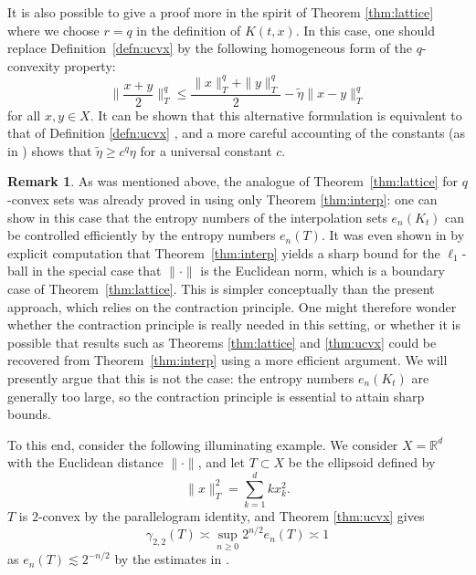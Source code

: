 \documentclass[10pt,reqno]{amsart}
\theoremstyle{definition}
\newtheorem{rem}[thm]{Remark}
\numberwithin{equation}{section}
\numberwithin{figure}{section}
\numberwithin{table}{section}
\begin{document}
It is also possible to give a proof more in the spirit of Theorem 
\ref{thm:lattice} where we choose $r=q$ in the definition of $K(t,x)$.
In this case, one should replace Definition~\ref{defn:ucvx}
by the following homogeneous form of the $q$-convexity property:
$$
        \bigg\|\frac{x+y}{2}\bigg\|_T^q \le
	\frac{\|x\|_T^q+\|y\|_T^q}{2}
	-\tilde\eta\|x-y\|_T^q
$$
for all $x,y\in X$. It can be shown that this alternative formulation is 
equivalent to that of Definition \ref{defn:ucvx} \cite[Proposition 
7]{BCL94}, and a more careful accounting of the constants (as in 
\cite[Lemma 2.2]{Nao12}) shows that $\tilde\eta\ge c^q\eta$ for a 
universal constant $c$.

\begin{rem}
As was mentioned above, the analogue of Theorem~\ref{thm:lattice} for 
$q$-convex sets was already proved in \cite{vH16a} using only Theorem 
\ref{thm:interp}: one can show in this case that the entropy numbers of 
the interpolation sets $e_n(K_t)$ can be controlled efficiently by the 
entropy numbers $e_n(T)$. It was even shown in \cite{vH16a} by 
explicit computation that Theorem~\ref{thm:interp} yields a sharp bound 
for the $\ell_1$-ball in the special case that $\|\cdot\|$ is the 
Euclidean norm, which is a boundary case of Theorem~\ref{thm:lattice}. 
This is simpler conceptually than the present approach, which relies 
on the contraction principle. One might therefore wonder whether the 
contraction principle is really needed in this setting, or whether it is 
possible that results such as Theorems \ref{thm:lattice} and 
\ref{thm:ucvx} could be recovered from Theorem~\ref{thm:interp} using a 
more efficient argument. We will presently argue that this is not the 
case: the entropy numbers $e_n(K_t)$ are generally too large, so the 
contraction principle is essential to attain sharp bounds.

To this end, consider the following illuminating example. We consider
$X=\mathbb{R}^d$ with the Euclidean distance $\|\cdot\|$, and let 
$T\subset X$ be the ellipsoid defined by
$$
	\|x\|_T^2 =\sum_{k=1}^d k x_k^2.
$$
$T$ is $2$-convex by the parallelogram identity, and Theorem
\ref{thm:ucvx} gives
$$
	\gamma_{2,2}(T) \asymp \sup_{n\ge 0} 2^{n/2}e_n(T)\asymp 1
$$
as $e_n(T)\lesssim 2^{-n/2}$ by the estimates in \cite[section 2.5]{Tal14}.


\end{rem}
\end{document}
